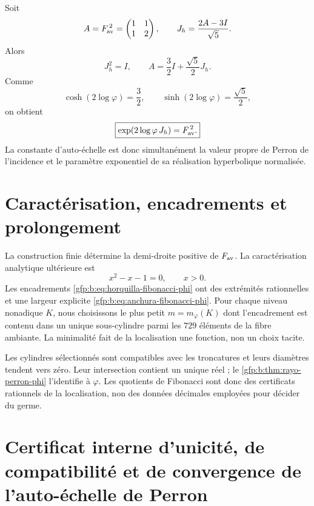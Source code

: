 Soit
\[
 A=F_{\rm av}^{\,2}=
 \begin{pmatrix}1&1\\1&2\end{pmatrix},
 \qquad
 J_h=\frac{2A-3I}{\sqrt5}.
\]
Alors
\[
 J_h^2=I,
 \qquad
 A=\frac32I+\frac{\sqrt5}{2}J_h.
\]
Comme
\[
 \cosh(2\log\varphi)=\frac32,
 \qquad
 \sinh(2\log\varphi)=\frac{\sqrt5}{2},
\]
on obtient
\begin{equation}
 \boxed{
 \exp(2\log\varphi\,J_h)=F_{\rm av}^{\,2}.}
 \label{gfp:b:eq:realizacion-hiperbolica-phi}
\end{equation}
La constante d’auto-échelle est donc simultanément la valeur propre de
Perron de l’incidence et le paramètre exponentiel de sa réalisation
hyperbolique normalisée.

\section{Caractérisation, encadrements et prolongement}

La construction finie détermine la demi-droite positive de \(F_{\rm av}\). La
caractérisation analytique ultérieure est
\[
 x^2-x-1=0,
 \qquad x>0.
\]
Les encadrements \eqref{gfp:b:eq:horquilla-fibonacci-phi} ont des extrémités rationnelles
et une largeur explicite \eqref{gfp:b:eq:anchura-fibonacci-phi}. Pour chaque niveau
nonadique \(K\), nous choisissons le plus petit \(m=m_{\varphi}(K)\) dont l’encadrement est
contenu dans un unique sous-cylindre parmi les \(729\) éléments de la fibre
ambiante. La minimalité fait de la localisation une fonction, non un
choix tacite.

Les cylindres sélectionnés sont compatibles avec les troncatures et leurs
diamètres tendent vers zéro. Leur intersection contient un unique réel ; le
\cref{gfp:b:thm:rayo-perron-phi} l’identifie à \(\varphi\). Les quotients de
Fibonacci sont donc des certificats rationnels de la localisation, non des données
décimales employées pour décider du germe.

\section{Certificat interne d’unicité, de compatibilité et de convergence de l’auto-échelle de Perron}

